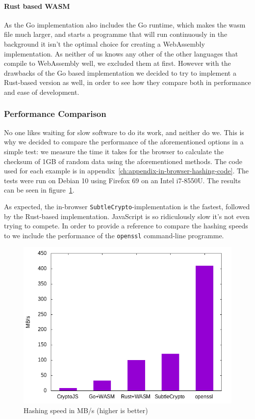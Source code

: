 \paragraph{Rust based WASM}
As the Go implementation also includes the Go runtime,
which makes the wasm file much larger,
and starts a programme that will run continuously in the background it isn't the optimal choice for creating a WebAssembly implementation.
As neither of us knows any other of the other languages that compile to WebAssembly well, we excluded them at first.
However with the drawbacks of the Go based implementation we decided to try to implement a Rust-based version as well,
in order to see how they compare both in performance and ease of development.


\subsubsection{Performance Comparison}
\label{subsec:perfcomphashing}
No one likes waiting for slow software to do its work, and neither do we.
This is why we decided to compare the performance of the aforementioned options in a simple test:
we measure the time it takes for the browser to calculate the checksum of 1GB of random data using the aforementioned methods.
The code used for each example is in appendix~\ref{ch:appendix-in-browser-hashing-code}.
The tests were run on Debian 10 using Firefox 69 on an Intel i7-8550U.
The results can be seen in figure~\ref{fig:hashingperformance}.

As expected, the in-browser \texttt{SubtleCrypto}-implementation is the fastest, followed by the Rust-based implementation.
JavaScript is so ridiculously slow it's not even trying to compete.
In order to provide a reference to compare the hashing speeds to we include the performance of the \texttt{openssl} command-line programme.

\begin{figure}
    \begin{center}
        \includegraphics[width=0.7\linewidth]{images/hashingperformance.png}
        \caption{Hashing speed in MB/s (higher is better)}
        \label{fig:hashingperformance}
    \end{center}
\end{figure}


